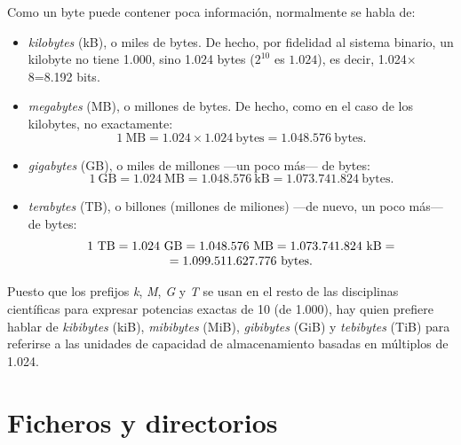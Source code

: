 Como un byte puede contener poca información, normalmente se habla de: \begin{itemize} \item \emph{kilobytes} (kB), o miles de bytes. De hecho, por fidelidad al sistema binario, un kilobyte no tiene 1.000, sino 1.024 bytes ($2^{10}$ es $1.024$), es decir, 1.024$\times$8=8.192 bits. \item \emph{megabytes} (MB), o millones de bytes. De hecho, como en el caso de los kilobytes, no exactamente: $$1~\mbox{MB} = 1.024 \times 1.024~\mbox{bytes}= 1.048.576~\mbox{bytes}.$$ \item \emph{gigabytes} (GB), o miles de millones ---un poco más--- de bytes: $$1~\mbox{GB}=1.024~\mbox{MB}=1.048.576~\mbox{kB}=1.073.741.824~\mbox{bytes}.$$ \item \emph{terabytes} (TB), o billones (millones de miliones) ---de nuevo, un poco más--- de bytes: \[ \begin{array}{c} $$1~\mbox{TB}=1.024~\mbox{GB}=1.048.576~\mbox{MB}=1.073.741.824~\mbox{kB}=\\ =1.099.511.627.776~\mbox{bytes}.$$ \end{array} \] \end{itemize} Puesto que los prefijos \emph{k}, \emph{M}, \emph{G} y \emph{T} se usan en el resto de las disciplinas científicas para expresar potencias exactas de 10 (de 1.000), hay quien prefiere hablar de \emph{kibibytes} (kiB), \emph{mibibytes} (MiB), \emph{gibibytes} (GiB) y \emph{tebibytes} (TiB) para referirse a las unidades de capacidad de almacenamiento basadas en múltiplos de 1.024. 

\section{Ficheros y directorios} \label{se:fitxers} \label{pg:fitxer} 

